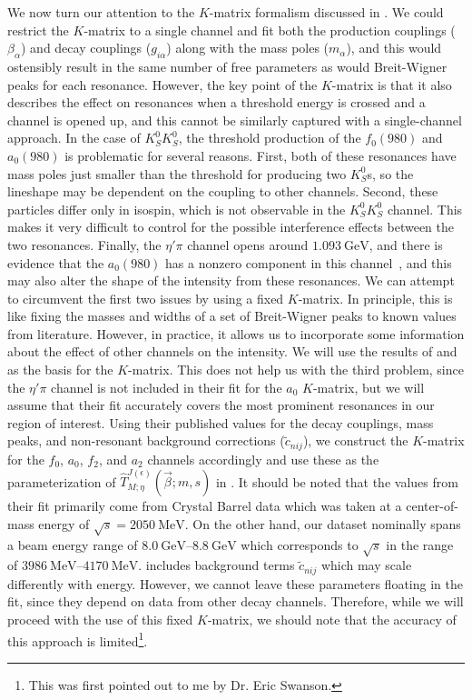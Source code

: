 We now turn our attention to the $K$-matrix formalism discussed in . We could restrict the $K$-matrix to a single channel and fit both the production couplings ($\beta_\alpha$) and decay couplings ($g_{i\alpha}$) along with the mass poles ($m_\alpha$), and this would ostensibly result in the same number of free parameters as would Breit-Wigner peaks for each resonance. However, the key point of the $K$-matrix is that it also describes the effect on resonances when a threshold energy is crossed and a channel is opened up, and this cannot be similarly captured with a single-channel approach. In the case of $K_S^0K_S^0$, the threshold production of the $f_0(980)$ and $a_0(980)$ is problematic for several reasons. First, both of these resonances have mass poles just smaller than the threshold for producing two $K_S^0$s, so the lineshape may be dependent on the coupling to other channels. Second, these particles differ only in isospin, which is not observable in the $K_S^0K_S^0$ channel. This makes it very difficult to control for the possible interference effects between the two resonances. Finally, the $\eta'\pi$ channel opens around $\SI{1.093}{\giga\electronvolt}$, and there is evidence that the $a_0(980)$ has a nonzero component in this channel~\cite{Ablikim2017,Chen2020}, and this may also alter the shape of the intensity from these resonances. We can attempt to circumvent the first two issues by using a fixed $K$-matrix. In principle, this is like fixing the masses and widths of a set of Breit-Wigner peaks to known values from literature. However, in practice, it allows us to incorporate some information about the effect of other channels on the intensity. We will use the results of \cite{Albrecht2020} and \cite{Kopf2021} as the basis for the $K$-matrix. This does not help us with the third problem, since the $\eta'\pi$ channel is not included in their fit for the $a_0$ $K$-matrix, but we will assume that their fit accurately covers the most prominent resonances in our region of interest. Using their published values for the decay couplings, mass peaks, and non-resonant background corrections ($\tilde{c}_{nij}$), we construct the $K$-matrix for the $f_0$, $a_0$, $f_2$, and $a_2$ channels accordingly and use these as the parameterization of $\hat{T}_{M;\eta}^{J(\epsilon)}(\vec{\beta};m,s)$ in . It should be noted that the values from their fit primarily come from Crystal Barrel data which was taken at a center-of-mass energy of $\sqrt{s} = \SI{2050}{\mega\electronvolt}$. On the other hand, our dataset nominally spans a beam energy range of $\qtyrange{8.0}{8.8}{\giga\electronvolt}$ which corresponds to $\sqrt{s}$ in the range of $\qtyrange{3986}{4170}{\mega\electronvolt}$.  includes background terms $\tilde{c}_{nij}$ which may scale differently with energy. However, we cannot leave these parameters floating in the fit, since they depend on data from other decay channels. Therefore, while we will proceed with the use of this fixed $K$-matrix, we should note that the accuracy of this approach is limited\footnote{This was first pointed out to me by Dr. Eric Swanson.}.

